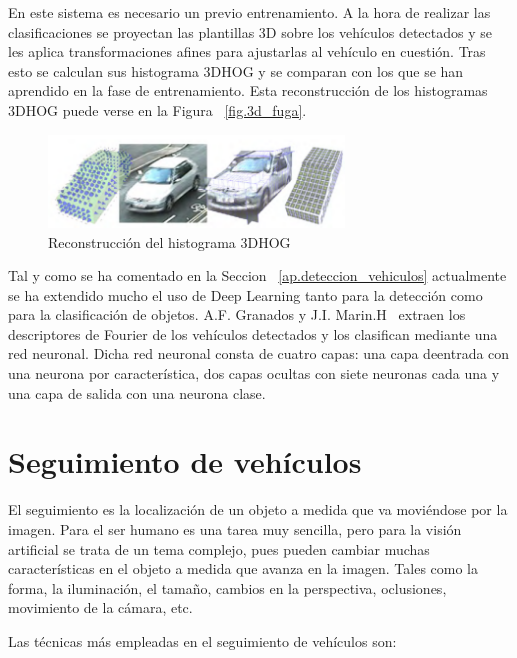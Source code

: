 En este sistema es necesario un previo entrenamiento. A la hora de realizar las clasificaciones se proyectan las plantillas 3D sobre los vehículos detectados y se les aplica transformaciones afines para ajustarlas al vehículo en cuestión. Tras esto se calculan sus histograma 3DHOG y se comparan con los que se han aprendido en la fase de entrenamiento. Esta reconstrucción de los histogramas 3DHOG puede verse en la Figura ~\ref{fig.3d_fuga}.

\begin{figure}[H]
  \begin{center}
    \includegraphics[width=0.7\textwidth]{figures/Estado_arte/3dhog_plantilla.png}
		\caption{Reconstrucción  del  histograma  3DHOG}
		\label{fig.3dhog_histograma}
		\end{center}
\end{figure}

Tal y como se ha comentado en la Seccion ~\ref{ap.deteccion_vehiculos} actualmente se ha extendido mucho el uso de Deep Learning tanto para la detección como para la clasificación de objetos. 
A.F. Granados y J.I. Marin.H~\cite{deteccion_flujo_vehicular} extraen los descriptores de Fourier de los vehículos detectados y los clasifican mediante una red neuronal. Dicha red neuronal consta de cuatro capas: una capa deentrada con una neurona por característica, dos capas ocultas con siete neuronas cada una y una capa de salida con una neurona clase. 


\section{Seguimiento de vehículos}

El seguimiento es la localización de un objeto a medida que va moviéndose por la imagen. Para el ser humano es una tarea muy sencilla, pero para la visión artificial se trata de un tema complejo, pues pueden cambiar muchas características en el objeto  a medida que avanza en la imagen. Tales como la forma, la iluminación, el tamaño, cambios en la perspectiva, oclusiones, movimiento de la cámara, etc.

Las técnicas más empleadas en el seguimiento de vehículos son:

